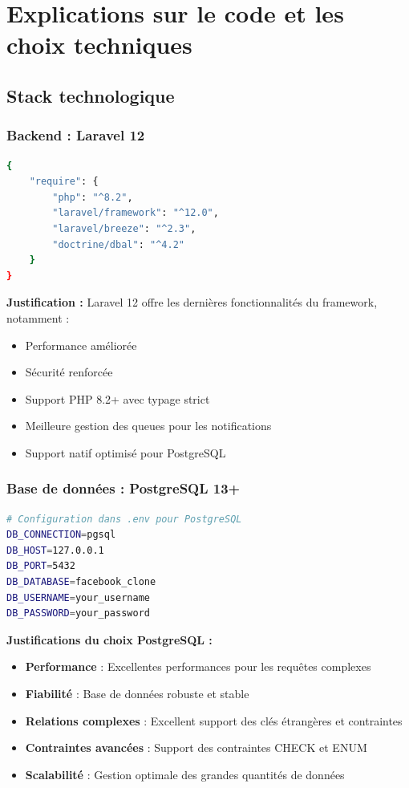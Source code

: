 \documentclass[12pt,a4paper]{article}
\begin{document}
\section{Explications sur le code et les choix techniques}

\subsection{Stack technologique}

\subsubsection{Backend : Laravel 12}
\begin{lstlisting}[language=bash]
{
    "require": {
        "php": "^8.2",
        "laravel/framework": "^12.0",
        "laravel/breeze": "^2.3",
        "doctrine/dbal": "^4.2"
    }
}
\end{lstlisting}

\textbf{Justification :} Laravel 12 offre les derni\`eres fonctionnalit\'es du framework, notamment :
\begin{itemize}
    \item Performance am\'elior\'ee
    \item S\'ecurit\'e renforc\'ee
    \item Support PHP 8.2+ avec typage strict
    \item Meilleure gestion des queues pour les notifications
    \item Support natif optimis\'e pour PostgreSQL
\end{itemize}

\subsubsection{Base de donn\'ees : PostgreSQL 13+}
\begin{lstlisting}[language=bash]
# Configuration dans .env pour PostgreSQL
DB_CONNECTION=pgsql
DB_HOST=127.0.0.1
DB_PORT=5432
DB_DATABASE=facebook_clone
DB_USERNAME=your_username
DB_PASSWORD=your_password
\end{lstlisting}

\textbf{Justifications du choix PostgreSQL :}
\begin{itemize}
    \item \textbf{Performance} : Excellentes performances pour les requ\^etes complexes
    \item \textbf{Fiabilit\'e} : Base de donn\'ees robuste et stable
    \item \textbf{Relations complexes} : Excellent support des cl\'es \'etrang\`eres et contraintes
    \item \textbf{Contraintes avanc\'ees} : Support des contraintes CHECK et ENUM
    \item \textbf{Scalabilit\'e} : Gestion optimale des grandes quantit\'es de donn\'ees
\end{itemize}
\end{document}
